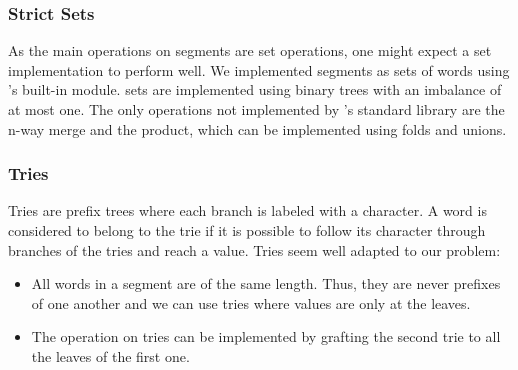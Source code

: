 \subsubsection{Strict Sets}

As the main operations on segments are set operations, one might 
expect a set implementation to perform well. We implemented segments as sets
of words using \ocaml's built-in  module. \ocaml sets are implemented
using binary trees with an imbalance of at most one.
The only operations not implemented by \ocaml's standard library are
the n-way merge and the product, which can be implemented using folds and unions.

\subsubsection{Tries}

Tries are prefix trees where each branch is labeled with
a character. A word is considered to belong to the trie if it is possible to
follow its character through branches of the tries and reach a value. 
Tries seem well adapted to our problem:
\begin{itemize}
\item All words in a segment are of the same length. Thus, they are never prefixes
  of one another and we can use tries where values are only
  at the leaves.
\item The  operation on tries can be implemented by
  grafting the second trie to all the leaves of the first one.
\end{itemize}

\TODO{}



